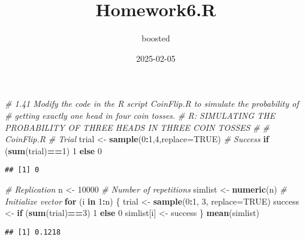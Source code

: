 \documentclass[
]{article}
\title{Homework6.R}
\author{boosted}
\date{2025-02-05}
\newenvironment{Shaded}{\begin{snugshade}}{\end{snugshade}}
\newcommand{\AttributeTok}[1]{\textcolor[rgb]{0.13,0.29,0.53}{#1}}
\newcommand{\CommentTok}[1]{\textcolor[rgb]{0.56,0.35,0.01}{\textit{#1}}}
\newcommand{\ConstantTok}[1]{\textcolor[rgb]{0.56,0.35,0.01}{#1}}
\newcommand{\ControlFlowTok}[1]{\textcolor[rgb]{0.13,0.29,0.53}{\textbf{#1}}}
\newcommand{\DecValTok}[1]{\textcolor[rgb]{0.00,0.00,0.81}{#1}}
\newcommand{\FunctionTok}[1]{\textcolor[rgb]{0.13,0.29,0.53}{\textbf{#1}}}
\newcommand{\NormalTok}[1]{#1}
\newcommand{\OtherTok}[1]{\textcolor[rgb]{0.56,0.35,0.01}{#1}}
\newcommand{\SpecialCharTok}[1]{\textcolor[rgb]{0.81,0.36,0.00}{\textbf{#1}}}
\begin{document}
\maketitle

\begin{Shaded}
\begin{Highlighting}[]
\CommentTok{\# 1.41 Modify the code in the R script CoinFlip.R to simulate the probability of}
\CommentTok{\# getting exactly one head in four coin tosses.}
\CommentTok{\# R: SIMULATING THE PROBABILITY OF THREE HEADS IN THREE COIN TOSSES}
\CommentTok{\#}
\CommentTok{\# CoinFlip.R}
\CommentTok{\# Trial}
\NormalTok{trial }\OtherTok{\textless{}{-}} \FunctionTok{sample}\NormalTok{(}\DecValTok{0}\SpecialCharTok{:}\DecValTok{1}\NormalTok{,}\DecValTok{4}\NormalTok{,}\AttributeTok{replace=}\ConstantTok{TRUE}\NormalTok{)}
\CommentTok{\# Success}
\ControlFlowTok{if}\NormalTok{ (}\FunctionTok{sum}\NormalTok{(trial)}\SpecialCharTok{==}\DecValTok{1}\NormalTok{) }\DecValTok{1} \ControlFlowTok{else} \DecValTok{0}
\end{Highlighting}
\end{Shaded}

\begin{verbatim}
## [1] 0
\end{verbatim}

\begin{Shaded}
\begin{Highlighting}[]
\CommentTok{\# Replication}
\NormalTok{n }\OtherTok{\textless{}{-}} \DecValTok{10000} \CommentTok{\# Number of repetitions}
\NormalTok{simlist }\OtherTok{\textless{}{-}} \FunctionTok{numeric}\NormalTok{(n) }\CommentTok{\# Initialize vector}
\ControlFlowTok{for}\NormalTok{ (i }\ControlFlowTok{in} \DecValTok{1}\SpecialCharTok{:}\NormalTok{n) \{}
\NormalTok{  trial }\OtherTok{\textless{}{-}} \FunctionTok{sample}\NormalTok{(}\DecValTok{0}\SpecialCharTok{:}\DecValTok{1}\NormalTok{, }\DecValTok{3}\NormalTok{, }\AttributeTok{replace=}\ConstantTok{TRUE}\NormalTok{)}
\NormalTok{  success }\OtherTok{\textless{}{-}} \ControlFlowTok{if}\NormalTok{ (}\FunctionTok{sum}\NormalTok{(trial)}\SpecialCharTok{==}\DecValTok{3}\NormalTok{) }\DecValTok{1} \ControlFlowTok{else} \DecValTok{0}
\NormalTok{  simlist[i] }\OtherTok{\textless{}{-}}\NormalTok{ success \}}
\FunctionTok{mean}\NormalTok{(simlist)}
\end{Highlighting}
\end{Shaded}

\begin{verbatim}
## [1] 0.1218
\end{verbatim}
\end{document}
